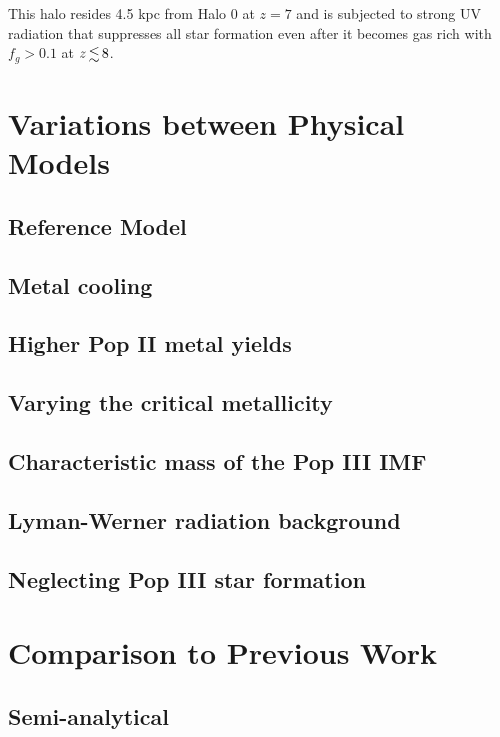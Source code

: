 \documentclass[useAMS,usenatbib]{mn2e}
\begin{document}
 This halo resides 4.5 kpc from Halo 0 at $z=7$ and is
subjected to strong UV radiation that suppresses all star formation
even after it becomes gas rich with $f_g > 0.1$ at $z \la 8$.

\section{Variations between Physical Models}
\label{sec:models}

\subsection{Reference Model}

\subsection{Metal cooling}

\subsection{Higher Pop II metal yields}

\subsection{Varying the critical metallicity}

\subsection{Characteristic mass of the Pop III IMF}

\subsection{Lyman-Werner radiation background}

\subsection{Neglecting Pop III star formation}

\section{Comparison to Previous Work}
\label{sec:compare}

\subsection{Semi-analytical}
\end{document}
